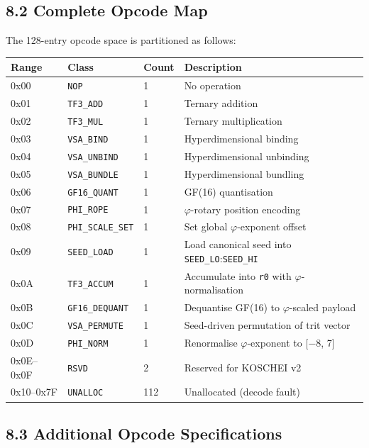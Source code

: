 \subsection{8.2 Complete Opcode
Map}\label{fa_26:complete-opcode-map}

The 128-entry opcode space is partitioned as follows:

\begin{longtable}[]{@{}llll@{}}
\toprule\noalign{}
Range & Class & Count & Description \\
\midrule\noalign{}
\endhead
\bottomrule\noalign{}
\endlastfoot
0x00 & \texttt{NOP} & 1 & No operation \\
0x01 & \texttt{TF3\_ADD} & 1 & Ternary addition \\
0x02 & \texttt{TF3\_MUL} & 1 & Ternary
multiplication \\
0x03 & \texttt{VSA\_BIND} & 1 &
Hyperdimensional binding \\
0x04 & \texttt{VSA\_UNBIND} & 1 &
Hyperdimensional unbinding \\
0x05 & \texttt{VSA\_BUNDLE} & 1 &
Hyperdimensional bundling \\
0x06 & \texttt{GF16\_QUANT} & 1 & GF(16)
quantisation \\
0x07 & \texttt{PHI\_ROPE} & 1 & \(\varphi\)-rotary
position encoding \\
0x08 & \texttt{PHI\_SCALE\_SET} & 1 & Set global
\(\varphi\)-exponent offset \\
0x09 & \texttt{SEED\_LOAD} & 1 & Load canonical
seed into \texttt{SEED\_LO}:\texttt{SEED\_HI} \\
0x0A & \texttt{TF3\_ACCUM} & 1 & Accumulate into
\texttt{r0} with \(\varphi\)-normalisation \\
0x0B & \texttt{GF16\_DEQUANT} & 1 & Dequantise
GF(16) to \(\varphi\)-scaled payload \\
0x0C & \texttt{VSA\_PERMUTE} & 1 &
Seed-driven permutation of trit vector \\
0x0D & \texttt{PHI\_NORM} & 1 & Renormalise
\(\varphi\)-exponent to {[}−8, 7{]} \\
0x0E--0x0F & \texttt{RSVD} & 2 & Reserved for
KOSCHEI v2 \\
0x10--0x7F & \texttt{UNALLOC} & 112 &
Unallocated (decode fault) \\
\end{longtable}

\subsection{8.3 Additional Opcode
Specifications}\label{fa_26:additional-opcode-specs}

